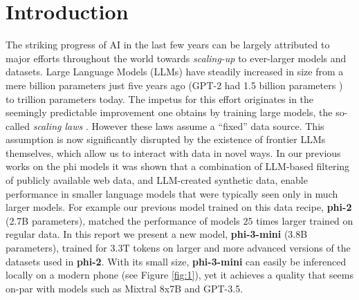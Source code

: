 \documentclass[11pt]{article}
\begin{document}
\section{Introduction}
The striking progress of AI in the last few years can be largely attributed to major efforts throughout the world towards {\em scaling-up} to ever-larger models and datasets. Large Language Models (LLMs) have steadily increased in size from a mere billion parameters just five years ago (GPT-2 had 1.5 billion parameters \cite{radford2019language}) to trillion parameters today. The impetus for this effort originates in the seemingly predictable improvement one obtains by training large models, the so-called {\em scaling laws} \cite{kaplan2020scaling, hoffmann2022training,muennighoff2023scaling}. However these laws assume a ``fixed'' data source. This assumption is now significantly disrupted by the existence of frontier LLMs themselves, which allow us to interact with data in novel ways. In our previous works on the phi models \cite{gunasekar2023textbooks,li2023textbooks, javaheripi2023phi} it was shown that a combination of LLM-based filtering of publicly available web data, and LLM-created synthetic data, enable performance in smaller language models that were typically seen only in much larger models. For example our previous model trained on this data recipe, \textbf{phi-2} (2.7B parameters), matched the performance of models $25$ times larger trained on regular data. In this report we present a new model, \textbf{phi-3-mini} (3.8B parameters), trained for 3.3T tokens on larger and more advanced versions of the datasets used in \textbf{phi-2}. With its small size, \textbf{phi-3-mini} can easily be inferenced locally on a modern phone (see Figure \ref{fig:1}), yet it achieves a quality that seems on-par with models such as Mixtral 8x7B \cite{jiang2024mixtral} and GPT-3.5.
\end{document}
